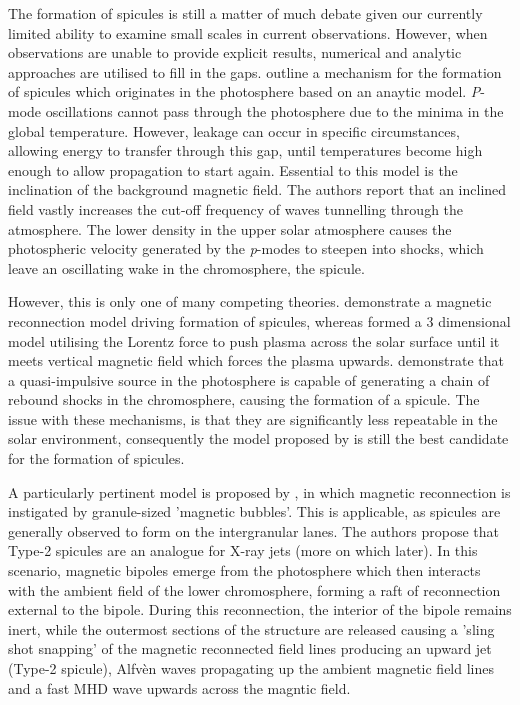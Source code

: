 The formation of spicules is still a matter of much debate given our currently limited ability to examine small scales in current observations. 
However, when observations are unable to provide explicit results, numerical and analytic approaches are utilised to fill in the gaps.
\cite{DePointeu2004} outline a mechanism for the formation of spicules which originates in the photosphere based on an anaytic model.
\emph{P}-mode oscillations cannot pass through the photosphere due to the minima in the global temperature.
However, leakage can occur in specific circumstances, allowing energy to transfer through this gap, until temperatures become high enough to allow propagation to start again.
Essential to this model is the inclination of the background magnetic field.
The authors report that an inclined field vastly increases the cut-off frequency of waves tunnelling through the atmosphere. 
The lower density in the upper solar atmosphere causes the photospheric velocity generated by the \emph{p}-modes to steepen into shocks, which leave an oscillating wake in the chromosphere, the spicule.

However, this is only one of many competing theories.
\cite{Takeuchi2001} demonstrate a magnetic reconnection model driving formation of spicules, whereas \cite{Martinez2011} formed a $3$ dimensional model utilising the Lorentz force to push plasma across the solar surface until it meets vertical magnetic field which forces the plasma upwards.
\cite{Hollweg1982} demonstrate that a quasi-impulsive source in the photosphere is capable of generating a chain of rebound shocks in the chromosphere, causing the formation of a spicule.
The issue with these mechanisms, is that they are significantly less repeatable in the solar environment, consequently the model proposed by \cite{DePointeu2004} is still the best candidate for the formation of spicules. 

A particularly pertinent model is proposed by \cite{Moore2011spic_recon}, in which magnetic reconnection is instigated by granule-sized 'magnetic bubbles'.
This is applicable, as spicules are generally observed to form on the intergranular lanes.
The authors propose that Type-2 spicules are an analogue for X-ray jets (more on which later).
In this scenario, magnetic bipoles emerge from the photosphere which then interacts with the ambient field of the lower chromosphere, forming a raft of reconnection external to the bipole.
During this reconnection, the interior of the bipole remains inert, while the outermost sections of the structure are released causing a 'sling shot snapping' of the magnetic reconnected field lines producing an upward jet (Type-2 spicule), Alfv{\`e}n waves propagating up the ambient magnetic field lines and a fast MHD wave upwards across the magntic field.

